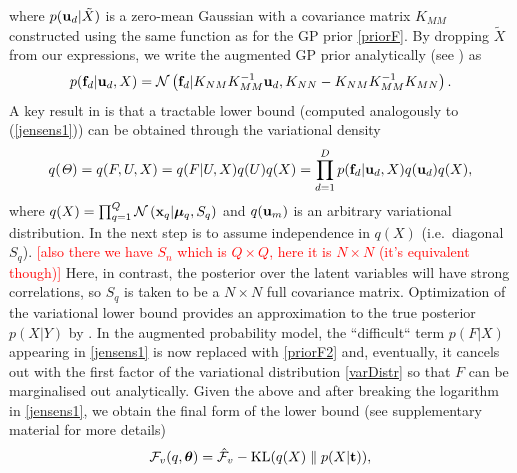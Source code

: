 \documentclass{article} %
\begin{document}
where $p(\mathbf{u}_d | \tilde{X})$ is a zero-mean Gaussian with a
covariance matrix $K_{MM}$ constructed using the same function as for
the GP prior \eqref{priorF}. By dropping $\tilde{X}$ from our
expressions, we write the augmented GP prior analytically (see
\cite{rasmussen-williams}) as
\begin{equation}
 \label{priorF2}
p(\mathbf{f}_d | \mathbf{u}_d, X) =  \mathcal{N}  \left( \mathbf{f}_d | K_{NM} K_{MM}^{-1} \mathbf{u}_d , K_{NN} - K_{NM} K_{MM}^{-1} K_{MN} \right).
\end{equation}
A key result in \cite{BayesianGPLVM}
 is that a tractable lower bound 
(computed analogously to (\ref{jensens1})) can be obtained through the variational density
\begin{equation}
\label{varDistr}
q(\mathit{\Theta}) = q(F, U,X) = q(F | U, X) q(U) q(X) = \prod_{d=1}^D p(\mathbf{f}_d | \mathbf{u}_d, X )q(\mathbf{u}_d) q(X),
\end{equation}
%
where $q(X) = \prod_{q=1}^Q \mathcal{N} \left( \mathbf{x}_q | \boldsymbol \mu_q, S_q
\right)$ and $q(\mathbf{u}_m)$ is an arbitrary variational distribution. 
In  \cite{BayesianGPLVM} the next step is to assume
independence in $q(X)$ (i.e.\ diagonal $S_q$). 
\textcolor{red}{[also there we have $S_n$ which is $Q \times Q$, here it is $N \times N$ (it's equivalent though)]}
Here, in contrast, 
the posterior over the latent variables will have strong correlations, 
so $S_q$ is taken to be a $N \times N$ full covariance
matrix. Optimization of the variational lower bound provides 
an approximation to the true posterior $p(X|Y)$ by .
%
In the augmented probability model, the ``difficult`` term $p(F | X)$
appearing in \eqref{jensens1} is now replaced with \eqref{priorF2}
and, eventually, it cancels out with the first factor of the
variational distribution \eqref{varDistr} so that $F$ can be
marginalised out analytically.
% 
%
Given the above and after breaking the logarithm in \eqref{jensens1},
we obtain the final form of the lower bound (see supplementary
material for more details)
%
\begin{equation}
\label{jensens}
\mathcal{F}_v(q, \boldsymbol \theta) = 
\hat{\mathcal{F}}_v - \text{KL}(q(X) \parallel p(X|\mathbf{t})),
\end{equation}
\end{document}
